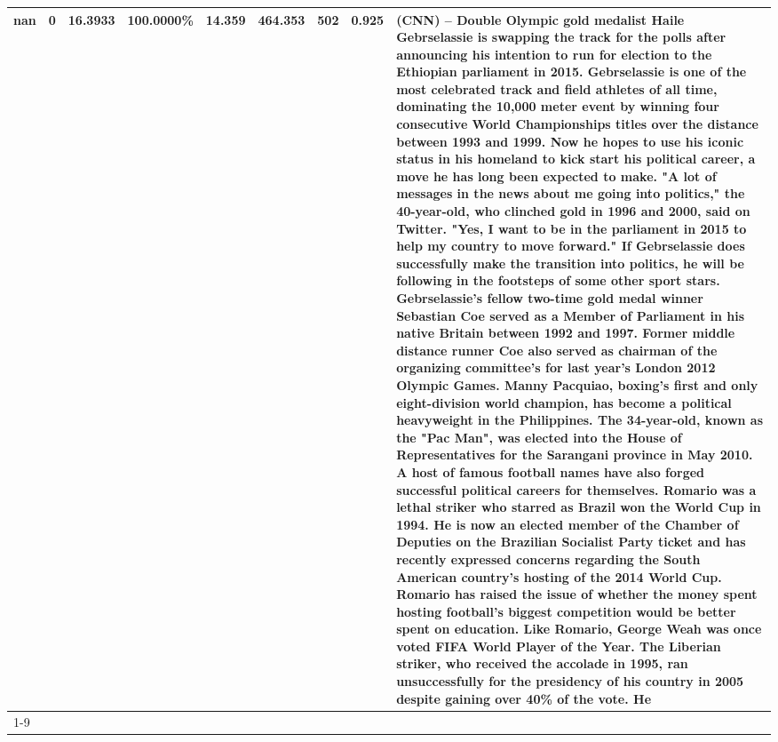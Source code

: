 \begin{table}[H]
{\begin{tabular}{lllrlllll}
\midrule
nan & 0 & \bfseries 16.3933 & \bfseries 100.0000\% & 14.359 & 464.353 & 502 & 0.925 & (CNN) -- Double Olympic gold medalist Haile Gebrselassie is swapping the track for the polls after announcing his intention to run for election to the Ethiopian parliament in 2015. Gebrselassie is one of the most celebrated track and field athletes of all time, dominating the 10,000 meter event by winning four consecutive World Championships titles over the distance between 1993 and 1999. Now he hopes to use his iconic status in his homeland to kick start his political career, a move he has long been expected to make. "A lot of messages in the news about me going into politics," the 40-year-old, who clinched gold in 1996 and 2000, said on Twitter. "Yes, I want to be in the parliament in 2015 to help my country to move forward." If Gebrselassie does successfully make the transition into politics, he will be following in the footsteps of some other sport stars. Gebrselassie's fellow two-time gold medal winner Sebastian Coe served as a Member of Parliament in his native Britain between 1992 and 1997. Former middle distance runner Coe also served as chairman of the organizing committee's for last year's London 2012 Olympic Games. Manny Pacquiao, boxing's first and only eight-division world champion, has become a political heavyweight in the Philippines. The 34-year-old, known as the "Pac Man", was elected into the House of Representatives for the Sarangani province in May 2010. A host of famous football names have also forged successful political careers for themselves. Romario was a lethal striker who starred as Brazil won the World Cup in 1994. He is now an elected member of the Chamber of Deputies on the Brazilian Socialist Party ticket and has recently expressed concerns regarding the South American country's hosting of the 2014 World Cup. Romario has raised the issue of whether the money spent hosting football's biggest competition would be better spent on education. Like Romario, George Weah was once voted FIFA World Player of the Year. The Liberian striker, who received the accolade in 1995, ran unsuccessfully for the presidency of his country in 2005 despite gaining over 40\% of the vote. He \\
\cline{1-9}

\end{tabular}}
\end{table}
